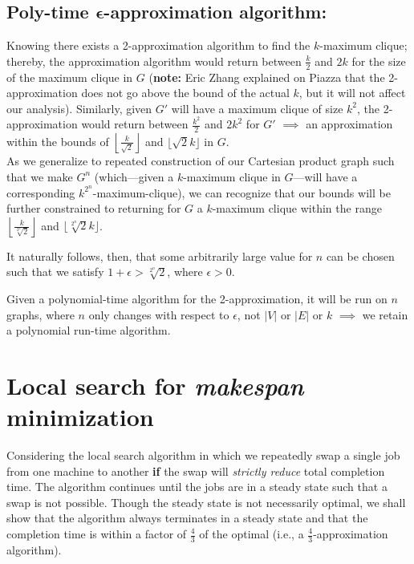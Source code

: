 \documentclass[conference]{styles/acmsiggraph}
\newcommand{\?}{\stackrel{?}{=}}
\DeclareRobustCommand{\mybox}[2][gray!20]{%
\begin{tcolorbox}[   %
        breakable,
        left=0pt,
        right=0pt,
        top=0pt,
        bottom=0pt,
        colback=#1,
        colframe=#1,
        width=\dimexpr\textwidth\relax, 
        enlarge left by=0mm,
        boxsep=5pt,
        arc=0pt,outer arc=0pt,
        ]
        #2
\end{tcolorbox}
}
\begin{document}
\subsection{Poly-time $\mathbf{\epsilon}$-approximation algorithm:}
Knowing there exists a 2-approximation algorithm to find the $k$-maximum clique; thereby, the approximation algorithm would return between $\frac{k}{2}$ and $2k$ for the size of the maximum clique in $G$ (\textbf{note:} Eric Zhang explained on Piazza that the 2-approximation does not go above the bound of the actual $k$, but it will not affect our analysis).  Similarly, given $G'$ will have a maximum clique of size $k^2$, the 2-approximation would return between $\frac{k^2}{2}$ and $2k^2$ for $G'$ $\implies$ an approximation within the bounds of $\left \lfloor \frac{k}{\sqrt{2}} \right \rfloor$ and $\lfloor \sqrt{2}k\rfloor$ in $G$.\\

As we generalize to repeated construction of our Cartesian product graph such that we make $G^n$ (which---given a $k$-maximum clique in $G$---will have a corresponding $k^2^n$-maximum-clique), we can recognize that our bounds will be further constrained to returning for $G$ a $k$-maximum clique within the range $\left \lfloor \frac{k}{\sqrt[2^n]{2}} \right \rfloor$ and $\lfloor \sqrt[2^n]{2}k\rfloor$.\\

\mybox{
It naturally follows, then, that some arbitrarily large value for $n$ can be chosen such that we satisfy $1 + \epsilon > \sqrt[2^n]{2}$, where $\epsilon > 0$.}

\mybox{
Given a polynomial-time algorithm for the 2-approximation, it will be run on $n$ graphs, where $n$ only changes with respect to $\epsilon$, not $|V|$ or $|E|$ or $k$ $\implies$ we retain a polynomial run-time algorithm. }
\newpage


\section{Local search for \textit{makespan} minimization}
Considering the local search algorithm in which we repeatedly swap a single job from one machine to another \textbf{if} the swap will \textit{strictly reduce} total completion time.  The algorithm continues until the jobs are in a steady state such that a swap is not possible.  Though the steady state is not necessarily optimal, we shall show that the algorithm always terminates in a steady state and that the completion time is within a factor of $\frac{4}{3}$ of the optimal (i.e., a $\frac{4}{3}$-approximation algorithm).
\end{document}
